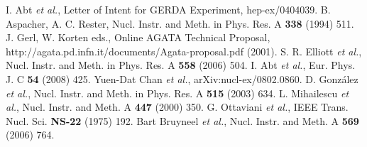 \begin{thebibliography}{99}
 I. Abt \textit{et al.}, Letter of Intent for GERDA   Experiment, hep-ex/0404039.
 B. Aspacher, A. C.  Rester, Nucl. Instr. and Meth.   in Phys. Res. A \textbf{338} (1994) 511.
J. Gerl, W. Korten eds., Online AGATA Technical   Proposal, http://agata.pd.infn.it/documents/Agata-proposal.pdf   (2001).
 S. R. Elliott \textit{et al.}, Nucl. Instr. and   Meth. in Phys. Res. A \textbf{558} (2006) 504.
 I. Abt \textit{et al.}, Eur. Phys. J. C \textbf{54}   (2008) 425.
 Yuen-Dat Chan \textit{et al.}, arXiv:nucl-ex/0802.0860.
 D. Gonz\'alez \textit{et al.}, Nucl. Instr. and Meth.   in Phys. Res. A \textbf{515} (2003) 634.
 L. Mihailescu \textit{et al.}, Nucl. Instr. and Meth.    A \textbf{447} (2000) 350.
G. Ottaviani \textit{et al.}, IEEE Trans. Nucl. Sci.   \textbf{NS-22} (1975) 192.
 Bart Bruyneel \textit{et al.}, Nucl. Instr. and Meth.    A \textbf{569} (2006) 764.

\end{thebibliography}

